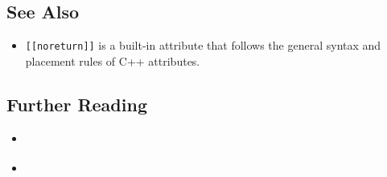 \subsection[See Also]{See Also}\label{see-also}

\begin{itemize}
\item{%
\lstinline![[noreturn]]! is a built-in attribute that follows the general syntax and placement rules of C++ attributes.}
\end{itemize}

\subsection[Further Reading]{Further Reading}\label{further-reading}

\begin{itemize}
\item{\cite{svoboda10}}
\item{\cite{sutter12}}
\end{itemize}




